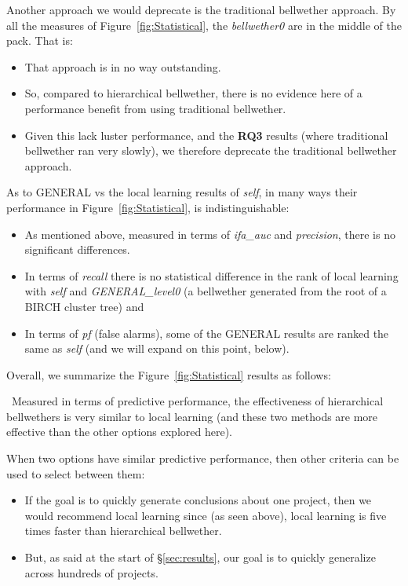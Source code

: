 \documentclass[10pt,journal,compsoc]{IEEEtran}
\newcommand{\bi}{\begin{itemize}}
\newcommand{\ei}{\end{itemize}}
\newenvironment{RQ}[1]%
{\noindent\begin{minipage}[c]{\linewidth}%
\begin{bclogo}[couleur=gray!20,%
                arrondi=0.1,logo=\bctrombone,%
                ombre=true%
                ]{{\small  ~#1}}}%
{\end{bclogo}\vspace{2mm}\end{minipage}}
\begin{document}
Another approach we would deprecate is the traditional bellwether approach.
By all the measures of
Figure~\ref{fig:Statistical},   the {\em bellwether0} are in the middle of the pack. That is:
\bi
\item
That approach is in no way outstanding. 
\item
So, 
compared to hierarchical bellwether,
 there is no evidence here of a performance
benefit from using  traditional bellwether.
\item
Given this lack luster performance, 
and   the {\bf RQ3} results (where traditional bellwether ran very slowly), we therefore  
deprecate the traditional bellwether approach.
 \ei
As to GENERAL vs the local learning results of {\em self}, in many ways their performance in  Figure~\ref{fig:Statistical},
is indistinguishable:
\bi
\item As mentioned above, measured in terms of {\em ifa\_auc}
and {\em precision}, there is no significant differences.
\item In terms of {\em recall} there is no statistical difference in the rank
of  local learning with {\em self} and 
  {\em GENERAL\_level0}
(a bellwether
generated from the root of a BIRCH cluster tree) and 
\item In terms of {\em pf} (false alarms), some of the GENERAL results are ranked
the same as {\em self} (and we will expand on this point, below).
\ei
Overall, we summarize the Figure~\ref{fig:Statistical} results as follows:




\begin{RQ}
{Measured in terms of predictive performance,
the effectiveness of hierarchical bellwethers
is very similar to local learning
(and these two methods are more effective
than the other options explored here). }
\end{RQ}

 
When two options have similar predictive
performance, then other criteria can be used
to select between them:
\bi
\item If the goal is to quickly generate
conclusions about one project, then we would recommend
local learning since (as seen above), local learning is five
times faster than hierarchical bellwether.
\item
But, as said at the start
of \S\ref{sec:results},
our goal is to quickly generalize across hundreds of
projects. 
\ei
 
\end{document}
